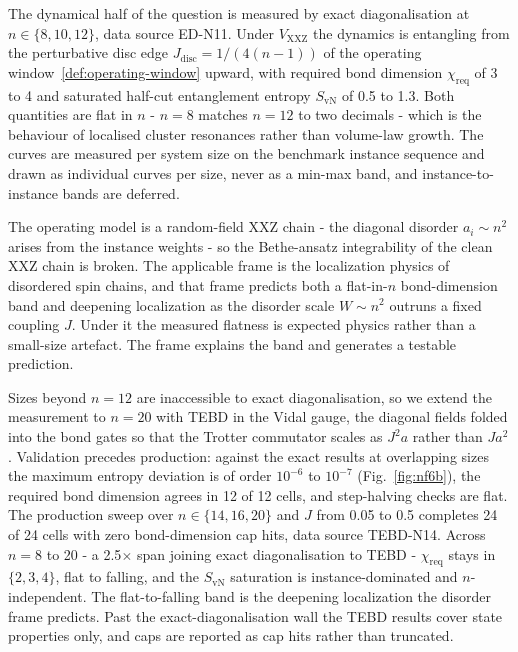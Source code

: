 The dynamical half of the question is measured by exact diagonalisation at $n \in \{8, 10, 12\}$, data source ED-N11. Under $V_{\mathrm{XXZ}}$ the dynamics is entangling from the perturbative disc edge $J_{\mathrm{disc}} = 1/(4(n-1))$ of the operating window~\eqref{def:operating-window} upward, with required bond dimension $\chi_{\mathrm{req}}$ of 3 to 4 and saturated half-cut entanglement entropy $S_{\mathrm{vN}}$ of 0.5 to 1.3. Both quantities are flat in $n$ - $n = 8$ matches $n = 12$ to two decimals - which is the behaviour of localised cluster resonances rather than volume-law growth. The curves are measured per system size on the benchmark instance sequence and drawn as individual curves per size, never as a min-max band, and instance-to-instance bands are deferred.

The operating model is a random-field XXZ chain - the diagonal disorder $a_i \sim n^{2}$ arises from the instance weights - so the Bethe-ansatz integrability of the clean XXZ chain is broken. The applicable frame is the localization physics of disordered spin chains, and that frame predicts both a flat-in-$n$ bond-dimension band and deepening localization as the disorder scale $W \sim n^{2}$ outruns a fixed coupling $J$. Under it the measured flatness is expected physics rather than a small-size artefact. The frame explains the band and generates a testable prediction.

Sizes beyond $n = 12$ are inaccessible to exact diagonalisation, so we extend the measurement to $n = 20$ with TEBD in the Vidal gauge, the diagonal fields folded into the bond gates so that the Trotter commutator scales as $J^{2} a$ rather than $J a^{2}$. Validation precedes production: against the exact results at overlapping sizes the maximum entropy deviation is of order $10^{-6}$ to $10^{-7}$ (Fig.~\ref{fig:nf6b}), the required bond dimension agrees in 12 of 12 cells, and step-halving checks are flat. The production sweep over $n \in \{14, 16, 20\}$ and $J$ from 0.05 to 0.5 completes 24 of 24 cells with zero bond-dimension cap hits, data source TEBD-N14. Across $n = 8$ to 20 - a 2.5$\times$ span joining exact diagonalisation to TEBD - $\chi_{\mathrm{req}}$ stays in $\{2, 3, 4\}$, flat to falling, and the $S_{\mathrm{vN}}$ saturation is instance-dominated and $n$-independent. The flat-to-falling band is the deepening localization the disorder frame predicts. Past the exact-diagonalisation wall the TEBD results cover state properties only, and caps are reported as cap hits rather than truncated.

